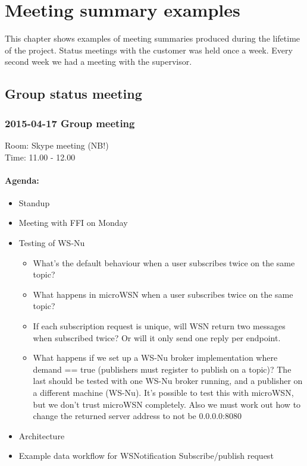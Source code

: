 \chapter{Meeting summary examples}
\label{appendix-meeting_summaries}

This chapter shows examples of meeting summaries produced during the lifetime of the project. Status meetings with the customer was held once a week. Every second week we had a meeting with the supervisor.

\section{Group status meeting}

\subsection*{2015-04-17 Group meeting}
Room: Skype meeting (NB!) \\
\noindent Time: 11.00 - 12.00

\subsubsection*{Agenda:}
\begin{itemize}
\setlength{\itemsep}{0cm}%
\item Standup
\item Meeting with FFI on Monday
\item Testing of WS-Nu \begin{itemize}
\setlength{\itemsep}{0cm}%
\item What’s the default behaviour when a user subscribes twice on the same topic?
\item What happens in microWSN when a user subscribes twice on the same topic?
\item If each subscription request is unique, will WSN return two messages when subscribed twice? Or will it only send one reply per endpoint. 
\item What happens if we set up a WS-Nu broker implementation where demand == true (publishers must register to publish on a topic)? The last should be tested with one WS-Nu broker running, and a publisher on a different machine (WS-Nu). It’s possible to test this with microWSN, but we don’t trust microWSN completely. Also we must work out how to change the returned server address to not be 0.0.0.0:8080 
\end{itemize}
\item Architecture 
\item Example data workflow for WSNotification Subscribe/publish request
\end{itemize}

